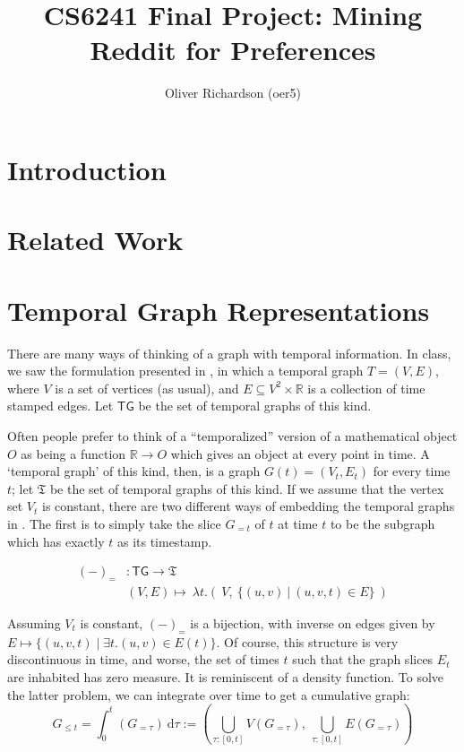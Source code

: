 \documentclass{article}
\author{Oliver Richardson (oer5)}
\title{CS6241 Final Project: Mining Reddit for Preferences}
\theoremstyle{definition}
\begin{document}
	\maketitle
	
	\section{Introduction}
	
	\section{Related Work}
	
	\section{Temporal Graph Representations}
	There are many ways of thinking of a graph with temporal information. In class, we saw the formulation presented in \cite{paranjape2017motifs}, in which a temporal graph $T = (V, E)$, where $V$ is a set of vertices (as usual), and $E \subseteq V^2 \times  \mathbb R$ is a collection of time stamped edges. Let $\mathsf{TG}$ be the set of temporal graphs of this kind.
	
	Often people prefer to think of a ``temporalized'' version of a mathematical object $O$ as being a function $\mathbb R \to O$ which gives an object at every point in time. A `temporal graph' of this kind, then, is a graph $G(t) = (V_t, E_t)$ for every time $t$; let $\mathfrak{T}$ be the set of temporal graphs of this kind. If we assume that the vertex set $V_t$ is constant, there are two different ways of embedding the temporal graphs in \cite{paranjape2017motifs}. The first is to simply take the slice $G_{=t}$ of $t$ at time $t$ to be the subgraph which has exactly $t$ as its timestamp.
	
	\begin{align*}
		(-)_{=}&: \mathsf{TG} \to \mathfrak T \\
		&(V, E) \mapsto ~\lambda t.\left( ~V,~\Big\{ (u,v)~\Big|~(u,v,t)\in E \Big\}~\right)
	\end{align*}
	
	Assuming $V_t$ is constant, $(-)_=$ is a bijection, with inverse on edges given by $E \mapsto \{ (u,v,t) \mid \exists t. (u,v) \in E(t) \}$. Of course, this structure is very discontinuous in time, and worse, the set of times $t$ such that the graph slices $E_t$ are inhabited has zero measure. It is reminiscent of a density function. To solve the latter problem, we can integrate over time to get a cumulative graph:
	\[ G_{\leq t} =  \int_0^t (G_{=\tau} )~\mathrm d \tau :=
		 \left( \bigcup_{\tau : [0,t]} V(G_{=\tau}), ~\bigcup_{\tau : [0,t]} E(G_{=\tau}) \right)\]
	
\end{document}
